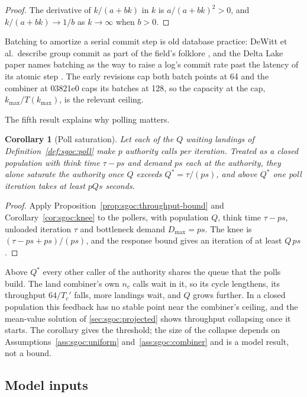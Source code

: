 \documentclass[11pt,letterpaper]{article}
\newtheorem{corollary}[theorem]{Corollary}
\theoremstyle{definition}
\theoremstyle{remark}
\begin{document}
\begin{proof}
The derivative of $k/(a + bk)$ in $k$ is $a/(a + bk)^2 > 0$, and $k/(a+bk) \to 1/b$ as $k \to \infty$ when $b > 0$.
\end{proof}

Batching to amortize a serial commit step is old database practice: DeWitt et al.\ describe group commit as part of the field's folklore \cite{dewitt1984main}, and the Delta Lake paper names batching as the way to raise a log's commit rate past the latency of its atomic step \cite{armbrust2020delta}. The early revisions cap both batch points at 64 and the combiner at 03821e0 caps its batches at 128, so the capacity at the cap, $k_{\max}/T(k_{\max})$, is the relevant ceiling.

The fifth result explains why polling matters.

\begin{corollary}[Poll saturation]
\label{cor:sgoc:poll}
Let each of the $Q$ waiting landings of Definition~\ref{def:sgoc:poll} make $p$ authority calls per iteration. Treated as a closed population with think time $\tau - ps$ and demand $ps$ each at the authority, they alone saturate the authority once $Q$ exceeds $Q^{*} = \tau/(ps)$, and above $Q^{*}$ one poll iteration takes at least $pQs$ seconds.
\end{corollary}

\begin{proof}
Apply Proposition~\ref{prop:sgoc:throughput-bound} and Corollary~\ref{cor:sgoc:knee} to the pollers, with population $Q$, think time $\tau - ps$, unloaded iteration $\tau$ and bottleneck demand $D_{\max} = ps$. The knee is $(\tau - ps + ps)/(ps)$, and the response bound gives an iteration of at least $Q\,ps$.
\end{proof}

Above $Q^{*}$ every other caller of the authority shares the queue that the polls build. The land combiner's own $n_c$ calls wait in it, so its cycle lengthens, its throughput $64/T_c'$ falls, more landings wait, and $Q$ grows further. In a closed population this feedback has no stable point near the combiner's ceiling, and the mean-value solution of \cref{sec:sgoc:projected} shows throughput collapsing once it starts. The corollary gives the threshold; the size of the collapse depends on Assumptions~\ref{ass:sgoc:uniform} and~\ref{ass:sgoc:combiner} and is a model result, not a bound.

\subsection{Model inputs}
\end{document}
